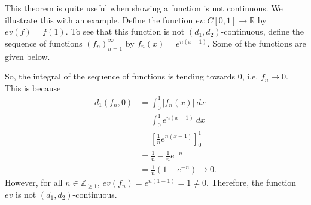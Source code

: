 \documentclass[a4paper, openany]{memoir}
\theoremstyle{definition}
\theoremstyle{plain}
\begin{document}
\noindent This theorem is quite useful when showing a function is not continuous. We illustrate this with an example. Define the function $ev: C[0, 1] \to \mathbb{R}$ by $ev(f) = f(1)$. To see that this function is not $(d_1, d_2)$-continuous, define the sequence of functions $(f_n)_{n=1}^{\infty}$ by $f_n(x) = e^{n(x-1)}$. Some of the functions are given below.
\begin{figure}[H]
    \centering
\end{figure}
\noindent So, the integral of the sequence of functions is tending towards $0$, i.e. $f_n \to 0$. This is because
\begin{align*}
    d_1(f_n, 0) &= \int_0^1 |f_n(x)| \ dx \\
    &= \int_0^1 e^{n(x-1)} \ dx \\
    &= \left[\frac{1}{n} e^{n(x-1)}\right]_0^1 \\
    &= \frac{1}{n} - \frac{1}{n} e^{-n} \\
    &= \frac{1}{n} (1 - e^{-n}) \to 0.
\end{align*}
However, for all $n \in \mathbb{Z}_{\geqslant 1}$, $ev(f_n) = e^{n(1-1)} = 1 \neq 0$. Therefore, the function $ev$ is not $(d_1, d_2)$-continuous.
\end{document}
